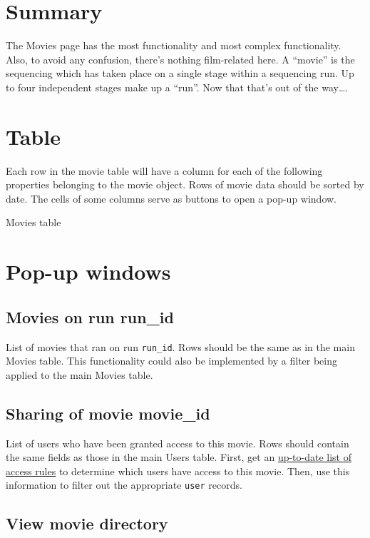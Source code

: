 
\section{Summary}
The Movies page has the most functionality and most complex functionality. Also, 
to avoid any confusion, there's nothing film-related here. A ``movie'' is the 
sequencing which has taken place on a single stage within a sequencing run. Up 
to four independent stages make up a ``run''. Now that that's out of the way….

\section{Table}
Each row in the movie table will have a column for each of the following properties 
belonging to the movie object. Rows of movie data should be sorted by date. The 
cells of some columns serve as buttons to open a pop-up window.

\begin{table}[h]
    
    \caption{Movies table}
\end{table}

\section{Pop-up windows}

\subsection{Movies on run run\_id}
List of movies that ran on run \texttt{run\_id}. Rows should be the same as in the main 
Movies table. This functionality could also be implemented by a filter being applied 
to the main Movies table.

\subsection{Sharing of movie movie\_id}
List of users who have been granted access to this movie. Rows should contain the 
same fields as those in the main Users table. First, get an 
\hyperref[section:updatingcollectionaccessrules]{up-to-date list of access rules} 
to determine which users have access to this movie. Then, use this information 
to filter out the appropriate \texttt{user} records.

\subsection{View movie directory}

